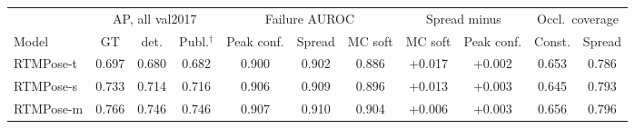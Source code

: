 \begin{tabular}{lcccccccccc}
\toprule
& \multicolumn{3}{c}{AP, all val2017} & \multicolumn{3}{c}{Failure AUROC} & \multicolumn{2}{c}{Spread minus} & \multicolumn{2}{c}{Occl.\ coverage} \\
\cmidrule(lr){2-4}\cmidrule(lr){5-7}\cmidrule(lr){8-9}\cmidrule(lr){10-11}
Model & GT & det. & Publ.$^{\dagger}$ & Peak conf. & Spread & MC soft & MC soft & Peak conf. & Const. & Spread \\
\midrule
RTMPose-t & 0.697 & 0.680 & 0.682 & 0.900 & 0.902 & 0.886 & +0.017 & +0.002 & 0.653 & 0.786 \\
RTMPose-s & 0.733 & 0.714 & 0.716 & 0.906 & 0.909 & 0.896 & +0.013 & +0.003 & 0.645 & 0.793 \\
RTMPose-m & 0.766 & 0.746 & 0.746 & 0.907 & 0.910 & 0.904 & +0.006 & +0.003 & 0.656 & 0.796 \\
\bottomrule
\end{tabular}
